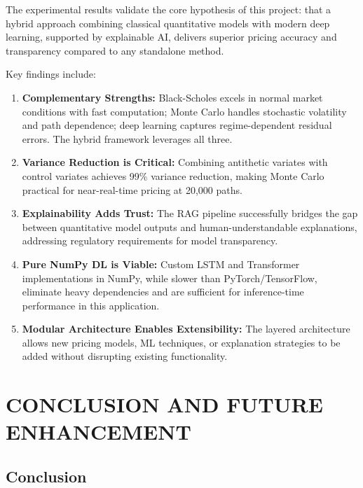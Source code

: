 \documentclass[12pt,a4paper]{report}
\begin{document}
The experimental results validate the core hypothesis of this project: that a hybrid approach combining classical quantitative models with modern deep learning, supported by explainable AI, delivers superior pricing accuracy and transparency compared to any standalone method.

Key findings include:

\begin{enumerate}
    \item \textbf{Complementary Strengths:} Black-Scholes excels in normal market conditions with fast computation; Monte Carlo handles stochastic volatility and path dependence; deep learning captures regime-dependent residual errors. The hybrid framework leverages all three.

    \item \textbf{Variance Reduction is Critical:} Combining antithetic variates with control variates achieves 99\% variance reduction, making Monte Carlo practical for near-real-time pricing at 20,000 paths.

    \item \textbf{Explainability Adds Trust:} The RAG pipeline successfully bridges the gap between quantitative model outputs and human-understandable explanations, addressing regulatory requirements for model transparency.

    \item \textbf{Pure NumPy DL is Viable:} Custom LSTM and Transformer implementations in NumPy, while slower than PyTorch/TensorFlow, eliminate heavy dependencies and are sufficient for inference-time performance in this application.

    \item \textbf{Modular Architecture Enables Extensibility:} The layered architecture allows new pricing models, ML techniques, or explanation strategies to be added without disrupting existing functionality.
\end{enumerate}



\chapter{CONCLUSION AND FUTURE ENHANCEMENT}

\section{Conclusion}
\end{document}
